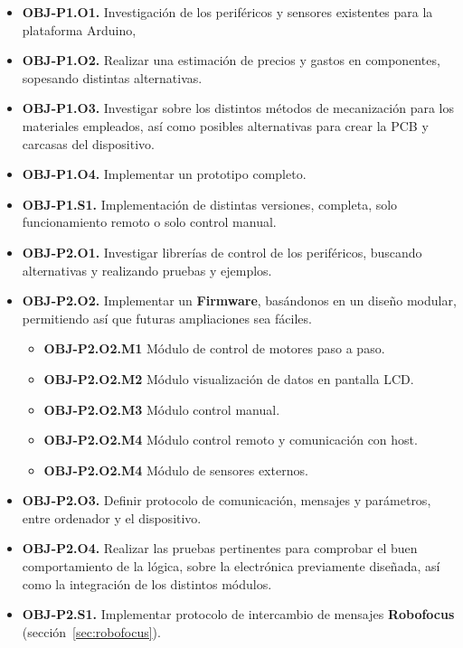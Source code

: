 \begin{itemize}
  \item \textbf{OBJ-P1.O1.}  Investigación de los periféricos y sensores existentes para la plataforma Arduino,
  \item \textbf{OBJ-P1.O2.}  Realizar una estimación de precios y gastos en componentes, sopesando distintas alternativas.
  \item \textbf{OBJ-P1.O3.}  Investigar sobre los distintos métodos de mecanización para los materiales empleados, así como posibles alternativas para crear la PCB y carcasas del dispositivo.
  \item \textbf{OBJ-P1.O4.}  Implementar un prototipo completo.
  \item \textbf{OBJ-P1.S1.}  Implementación de distintas versiones, completa, solo funcionamiento remoto o solo control manual.
\end{itemize}



\begin{itemize}
  \item \textbf{OBJ-P2.O1.} Investigar librerías de control de los periféricos, buscando alternativas y realizando pruebas y ejemplos.
  \item \textbf{OBJ-P2.O2.} Implementar un \textbf{Firmware}, basándonos en un diseño modular, permitiendo así que futuras ampliaciones sea fáciles.
  
  \begin{itemize}
  	\item \textbf{OBJ-P2.O2.M1} Módulo de control de motores paso a paso.
  	\item \textbf{OBJ-P2.O2.M2} Módulo visualización de datos en pantalla LCD.
  	\item \textbf{OBJ-P2.O2.M3} Módulo control manual.
  	\item \textbf{OBJ-P2.O2.M4} Módulo control remoto y comunicación con host.
  	\item \textbf{OBJ-P2.O2.M4} Módulo de sensores externos.
  \end{itemize}
  
 
  \item \textbf{OBJ-P2.O3.} Definir protocolo de comunicación, mensajes y parámetros, entre ordenador y el dispositivo.

  \item \textbf{OBJ-P2.O4.} Realizar las pruebas pertinentes para comprobar el buen comportamiento de la lógica, sobre la electrónica previamente diseñada, así como la integración de los distintos módulos.
  \item \textbf{OBJ-P2.S1.} Implementar protocolo de intercambio de mensajes \textbf{Robofocus} (sección~\ref{sec:robofocus}).
\end{itemize}


